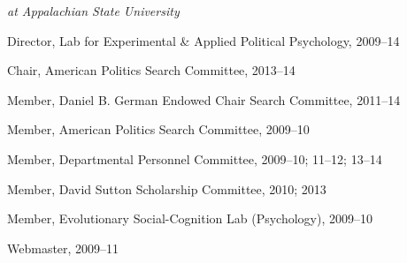 \documentclass[12pt]{article}
\newcommand{\halfblankline}{\quad\vspace{-0.5\baselineskip}\pagebreak[3]}
\begin{document}
\halfblankline
        
    \emph{at Appalachian State University}
        \begin{innerlist}
        \item[] Director, Lab for Experimental \& Applied Political Psychology, 2009--14
        \item[] Chair, American Politics Search Committee, 2013--14
        \item[] Member, Daniel B. German Endowed Chair Search Committee, 2011--14  
        \item[] Member, American Politics Search Committee, 2009--10
        \item[] Member, Departmental Personnel Committee, 2009--10; 11--12; 13--14
        \item[] Member, David Sutton Scholarship Committee, 2010; 2013
        \item[] Member, Evolutionary Social-Cognition Lab (Psychology), 2009--10
        \item[] Webmaster, 2009--11
        \end{innerlist}
\end{document}
